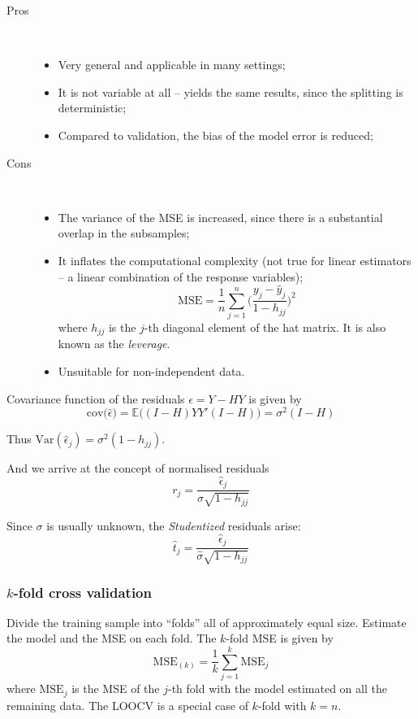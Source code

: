 \documentclass[a4paper]{article}
\newcommand{\ex}{\mathbb{E}}
\newcommand{\Var}[0]{{\text{Var}}}
\begin{document}
\begin{description}
	\item[Pros] \hfill\\
		\begin{itemize}
			\item Very general and applicable in many settings;
			\item It is not variable at all -- yields the same results, since the splitting is deterministic;
			\item Compared to validation, the bias of the model error is reduced;
		\end{itemize}
	\item[Cons] \hfill\\
		\begin{itemize}
			\item The variance of the MSE is increased, since there is a substantial overlap in the subsamples;
			\item It inflates the computational complexity (not true for linear estimators -- a linear combination of the response variables);
			\[\text{MSE} = \frac{1}{n}\sum_{j=1}^n \Big(\frac{y_j - \hat{y}_j}{1-h_{jj}}\Big)^2\]
			where $h_{jj}$ is the $j$-th diagonal element of the hat matrix. It is also known as the \emph{leverage}.
			\item Unsuitable for non-independent data.
		\end{itemize}
\end{description}

Covariance function of the residuals $\epsilon = Y - H Y$ is given by 
\[\text{cov}\big(\hat{\epsilon}\big) = \ex\big( (I-H)YY'(I-H) \big) = \sigma^2 (I-H)\]

Thus $\Var(\hat{\epsilon}_j) = \sigma^2 (1-h_{jj})$.

And we arrive at the concept of normalised residuals
\[r_j = \frac{\hat{\epsilon}_j}{\sigma \sqrt{1-h_{jj}}}\]

Since $\sigma$ is usually unknown, the \emph{Studentized} residuals arise:
\[ \hat{t}_j = \frac{\hat{\epsilon}_j}{\hat{\sigma} \sqrt{1-h_{jj}}}\]


\subsubsection{$k$-fold cross validation} %
\label{ssub:_k_fold_cross_validation}

Divide the training sample into ``folds'' all of approximately equal size. Estimate the model and the MSE on each fold. The $k$-fold MSE is given by 
\[\text{MSE}_{(k)} = \frac{1}{k}\sum_{j=1}^k \text{MSE}_j \]
where $\text{MSE}_j$ is the MSE of the $j$-th fold with the model estimated on all the remaining data. The LOOCV is a special case of $k$-fold with $k=n$.
\end{document}
